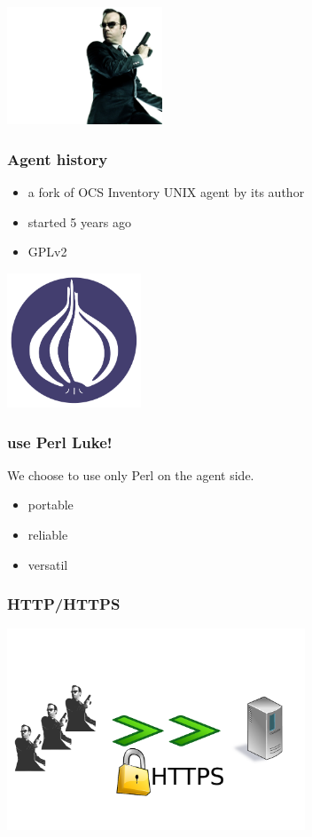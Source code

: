 %
\includegraphics[height=3.5cm]{./pics/agent-smith.jpg}

\begin{frame}
    \frametitle{Agent history}

    \begin{itemize}
        \item a fork of OCS Inventory UNIX agent by its author
        \item started 5 years ago
        \item GPLv2
    \end{itemize}
\end{frame}

\begin{frame}
    \includegraphics[height=4.0cm]{pics/Perl_Foundation.pdf}
    \frametitle{use Perl Luke!}

    We choose to use only Perl on the agent side.
    \begin{itemize}
        \item portable
        \item reliable
        \item versatil
    \end{itemize}
\end{frame}

\begin{frame}
    \frametitle{HTTP/HTTPS}

    \includegraphics[height=6.0cm]{pics/https.pdf}
\end{frame}

